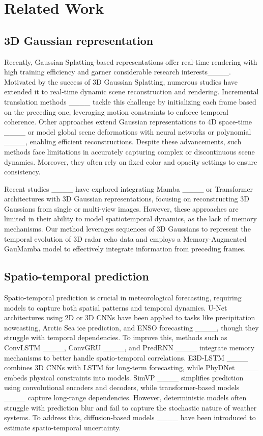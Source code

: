 \section{Related Work}
\subsection{3D Gaussian representation}

Recently, Gaussian Splatting-based representations offer real-time rendering with high training efficiency and garner considerable research interests____. Motivated by the success of 3D Gaussian Splatting, numerous studies have extended it to real-time dynamic scene reconstruction and rendering.
%
Incremental translation methods ____ tackle this challenge by initializing each frame based on the preceding one, leveraging motion constraints to enforce temporal coherence. Other approaches extend Gaussian representations to 4D space-time ____ or model global scene deformations with neural networks or polynomial ____, enabling efficient reconstructions. Despite these advancements, such methods face limitations in accurately capturing complex or discontinuous scene dynamics. Moreover, they often rely on fixed color and opacity settings to ensure consistency.

\textcolor{edit}{
Recent studies ____ have explored integrating Mamba ____ or Transformer architectures with 3D Gaussian representations, focusing on reconstructing 3D Gaussians from single or multi-view images. However, these approaches are limited in their ability to model spatiotemporal dynamics, as the lack of memory mechanisms. Our method leverages sequences of 3D Gaussians to represent the temporal evolution of 3D radar echo data and employs a Memory-Augmented GauMamba model to effectively integrate information from preceding frames. 
}

\subsection{Spatio-temporal prediction}

Spatio-temporal prediction is crucial in meteorological forecasting, requiring models to capture both spatial patterns and temporal dynamics. U-Net architectures using 2D or 3D CNNs have been applied to tasks like precipitation nowcasting, Arctic Sea ice prediction, and ENSO forecasting ____, though they struggle with temporal dependencies. To improve this, methods such as ConvLSTM ____, ConvGRU ____, and PredRNN ____ integrate memory mechanisms to better handle spatio-temporal correlations. E3D-LSTM ____ combines 3D CNNs with LSTM for long-term forecasting, while PhyDNet ____ embeds physical constraints into models. SimVP ____ simplifies prediction using convolutional encoders and decoders, while transformer-based models ____ capture long-range dependencies. However, deterministic models often struggle with prediction blur and fail to capture the stochastic nature of weather systems. To address this, diffusion-based models ____ have been introduced to estimate spatio-temporal uncertainty.